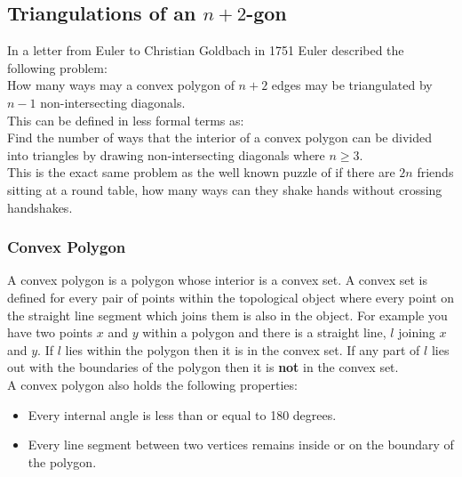 \documentclass[12pt]{article}
\begin{document}

\subsection{Triangulations of an $n+2$-gon}
In a letter from Euler to Christian Goldbach in 1751 Euler described the following problem:\\
How many ways may a convex polygon of $n + 2$ edges may be triangulated by $n - 1$ non-intersecting diagonals.\\
This can be defined in less formal terms as:\\
Find the number of ways that the interior of a convex polygon can be divided into triangles by drawing non-intersecting diagonals where $n \geq 3$.\\
This is the exact same problem as the well known puzzle of if there are $2n$ friends sitting at a round table, how many ways can they shake hands without crossing handshakes.

\subsubsection{Convex Polygon}
A convex polygon is a polygon whose interior is a convex set. A convex set is defined for every pair of points within the topological object where every point on the straight line segment which joins them is also in the object. For example you have two points $x$ and $y$ within a polygon and there is a straight line, $l$ joining $x$ and $y$. If $l$ lies within the polygon then it is in the convex set. If any part of $l$ lies out with the boundaries of the polygon then it is {\bf not} in the convex set.\\
A convex polygon also holds the following properties:
\begin{itemize}
\item Every internal angle is less than or equal to 180 degrees.
\item Every line segment between two vertices remains inside or on the boundary of the polygon.
\end{itemize}
\end{document}
